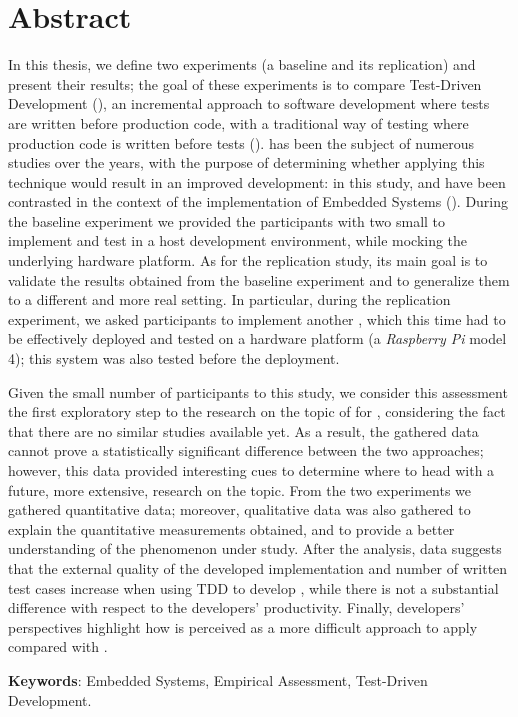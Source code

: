 \chapter*{Abstract}
In this thesis, we define two experiments (\ie a baseline and its replication) and present their results; the goal of these experiments is to compare Test-Driven Development (\tdd), an incremental approach to software development where tests are written before production code, with a traditional way of testing where production code is written before tests (\ie \notdd). 
\tdd has been the subject of numerous studies over the years, with the purpose of determining whether applying this technique would result in an improved development: in this study, \tdd and \notdd have been contrasted in the context of the implementation of Embedded Systems (\ess).
During the baseline experiment we provided the participants with two small \ess to implement and test in a host development environment, while mocking the underlying hardware platform.
As for the replication study, its main goal is to validate the results obtained from the baseline experiment and to generalize them to a different and more real setting. 
In particular, during the replication experiment, we asked participants to implement another \es, which this time had to be effectively deployed and tested on a hardware platform (\ie a \textit{Raspberry Pi} model 4); this system was also tested before the deployment.

Given the small number of participants to this study, we consider this assessment the first exploratory step to the research on the topic of \tdd for \ess, considering the fact that there are no similar studies available yet. As a result, the gathered data cannot prove a statistically significant difference between the two approaches; however, this data provided interesting cues to determine where to head with a future, more extensive, research on the topic.
From the two experiments we gathered quantitative data; moreover, qualitative data was also gathered to explain the quantitative measurements obtained, and to provide a better understanding of the phenomenon under study.
After the analysis, data suggests that the external quality of the developed implementation and number of written test cases increase when using TDD to develop \ess, while there is not a substantial difference with respect to the developers' productivity. 
Finally, developers' perspectives highlight how \tdd is perceived as a more difficult approach to apply compared with \notdd.

\noindent \textbf{Keywords}: Embedded Systems, Empirical Assessment, Test-Driven Development.